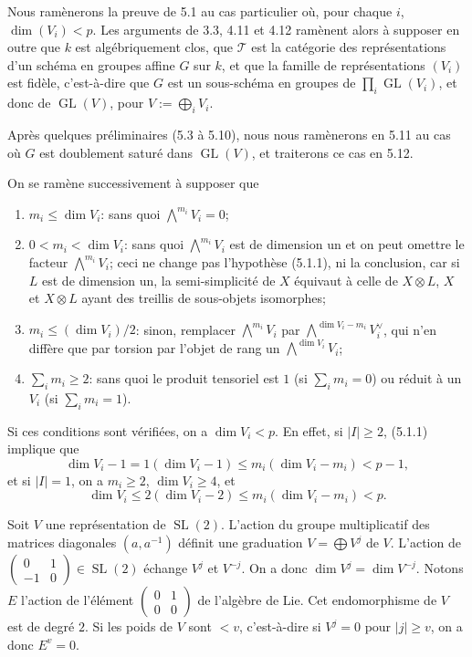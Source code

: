 \documentclass[10pt]{article}
\newcommand{\GL}{\operatorname{GL}}
\newcommand{\SL}{\operatorname{SL}}
\newcommand{\T}{\mathcal T}
\theoremstyle{deligne}
\newcommand{\heading}[1]{\vspace{0.7em}\noindent{\bfseries #1}\quad}
\begin{document}
Nous ramènerons la preuve de 5.1 au cas particulier où, pour chaque \(i\), \(\dim(V_i)<p\). Les arguments de 3.3, 4.11 et 4.12 ramènent alors à supposer en outre que \(k\) est algébriquement clos, que \(\T\) est la catégorie des représentations d'un schéma en groupes affine \(G\) sur \(k\), et que la famille de représentations \((V_i)\) est fidèle, c'est-à-dire que \(G\) est un sous-schéma en groupes de \(\prod_i\GL(V_i)\), et donc de \(\GL(V)\), pour \(V:=\bigoplus_iV_i\).

Après quelques préliminaires (5.3 à 5.10), nous nous ramènerons en 5.11 au cas où \(G\) est doublement saturé dans \(\GL(V)\), et traiterons ce cas en 5.12.

\heading{5.2. Réduction au cas où \(\dim(V_i)<p\).}
On se ramène successivement à supposer que
\begin{enumerate}[label=(\arabic*)]
\item \(m_i\le \dim V_i\): sans quoi \(\bigwedge^{m_i}V_i=0\);
\item \(0<m_i<\dim V_i\): sans quoi \(\bigwedge^{m_i}V_i\) est de dimension un et on peut omettre le facteur \(\bigwedge^{m_i}V_i\); ceci ne change pas l'hypothèse (5.1.1), ni la conclusion, car si \(L\) est de dimension un, la semi-simplicité de \(X\) équivaut à celle de \(X\otimes L\), \(X\) et \(X\otimes L\) ayant des treillis de sous-objets isomorphes;
\item \(m_i\le (\dim V_i)/2\): sinon, remplacer \(\bigwedge^{m_i}V_i\) par \(\bigwedge^{\dim V_i-m_i}V_i^\vee\), qui n'en diffère que par torsion par l'objet de rang un \(\bigwedge^{\dim V_i}V_i\);
\item \(\sum_i m_i\ge2\): sans quoi le produit tensoriel est \(1\) (si \(\sum_i m_i=0\)) ou réduit à un \(V_i\) (si \(\sum_i m_i=1\)).
\end{enumerate}
Si ces conditions sont vérifiées, on a \(\dim V_i<p\). En effet, si \(|I|\ge2\), (5.1.1) implique que
\[
  \dim V_i-1=1(\dim V_i-1)\le m_i(\dim V_i-m_i)<p-1,
\]
et si \(|I|=1\), on a \(m_i\ge2\), \(\dim V_i\ge4\), et
\[
  \dim V_i\le 2(\dim V_i-2)\le m_i(\dim V_i-m_i)<p.
\]

\heading{5.3.}
Soit \(V\) une représentation de \(\SL(2)\). L'action du groupe multiplicatif des matrices diagonales \((a,a^{-1})\) définit une graduation \(V=\bigoplus V^j\) de \(V\). L'action de \(\begin{pmatrix}0&1\\-1&0\end{pmatrix}\in\SL(2)\) échange \(V^j\) et \(V^{-j}\). On a donc \(\dim V^j=\dim V^{-j}\). Notons \(E\) l'action de l'élément \(\begin{pmatrix}0&1\\0&0\end{pmatrix}\) de l'algèbre de Lie. Cet endomorphisme de \(V\) est de degré \(2\). Si les poids de \(V\) sont \(<v\), c'est-à-dire si \(V^j=0\) pour \(|j|\ge v\), on a donc \(E^v=0\).
\end{document}
